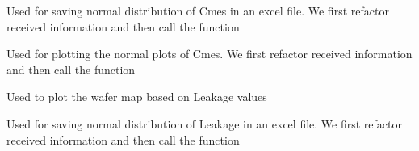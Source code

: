 \documentclass[letterpaper,10pt,english]{sphinxmanual}
\begin{document}

\begin{fulllineitems}
\label{\detokenize{app:app.Cmes_excel_normal}}
\pysigstartsignatures
{}
\pysigstopsignatures
\sphinxAtStartPar
Used for saving normal distribution of Cmes in an excel file.
We first refactor received information and then call the function

\end{fulllineitems}


\begin{fulllineitems}
\label{\detokenize{app:app.Cmes_normal}}
\pysigstartsignatures
{}
\pysigstopsignatures
\sphinxAtStartPar
Used for plotting the normal plots of Cmes.
We first refactor received information and then call the function

\end{fulllineitems}


\begin{fulllineitems}
\label{\detokenize{app:app.Leak_WM}}
\pysigstartsignatures
{}
\pysigstopsignatures
\sphinxAtStartPar
Used to plot the wafer map based on Leakage values

\end{fulllineitems}


\begin{fulllineitems}
\label{\detokenize{app:app.Leak_excel_normal}}
\pysigstartsignatures
{}
\pysigstopsignatures
\sphinxAtStartPar
Used for saving normal distribution of Leakage in an excel file.
We first refactor received information and then call the function

\end{fulllineitems}
\end{document}
